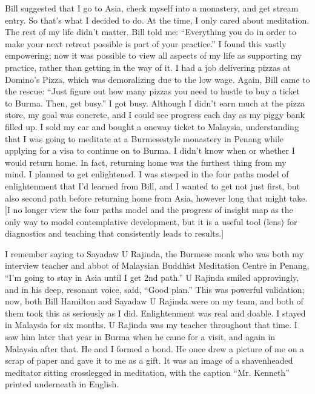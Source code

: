 \documentclass[a5paper,10pt,english]{book}
\begin{document}
\sphinxAtStartPar
Bill suggested that I go to Asia, check myself into a monastery, and get
stream entry. So that’s what I decided to do. At the time, I only cared
about meditation. The rest of my life didn’t matter. Bill told me:
“Everything you do in order to make your next retreat possible is part
of your practice.” I found this vastly empowering; now it was possible
to view all aspects of my life as supporting my practice, rather than
getting in the way of it. I had a job delivering pizzas at Domino’s
Pizza, which was demoralizing due to the low wage. Again, Bill came to
the rescue: “Just figure out how many pizzas you need to hustle to buy a
ticket to Burma. Then, get busy.” I got busy. Although I didn’t earn
much at the pizza store, my goal was concrete, and I could see progress
each day as my piggy bank filled up. I sold my car and bought a one\sphinxhyphen{}way
ticket to Malaysia, understanding that I was going to meditate at a
Burmese\sphinxhyphen{}style monastery in Penang while applying for a visa to continue
on to Burma. I didn’t know when or whether I would return home. In fact,
returning home was the furthest thing from my mind. I planned to get
enlightened. I was steeped in the four paths model of enlightenment that
I’d learned from Bill, and I wanted to get not just first, but also
second path before returning home from Asia, however long that might
take. {[}I no longer view the four paths model and the progress of insight
map as the only way to model contemplative development, but it is a
useful tool (lens) for diagnostics and teaching that consistently leads
to results.{]}

\sphinxAtStartPar
I remember saying to Sayadaw U Rajinda, the Burmese monk who was both my
interview teacher and abbot of Malaysian Buddhist Meditation Centre in
Penang, “I’m going to stay in Asia until I get 2nd path.” U Rajinda
smiled approvingly, and in his deep, resonant voice, said, “Good plan.”
This was powerful validation; now, both Bill Hamilton and Sayadaw U
Rajinda were on my team, and both of them took this as seriously as I
did. Enlightenment was real and doable. I stayed in Malaysia for six
months. U Rajinda was my teacher throughout that time. I saw him later
that year in Burma when he came for a visit, and again in Malaysia after
that. He and I formed a bond. He once drew a picture of me on a scrap of
paper and gave it to me as a gift. It was an image of a shaven\sphinxhyphen{}headed
meditator sitting cross\sphinxhyphen{}legged in meditation, with the caption “Mr.
Kenneth” printed underneath in English.
\end{document}
